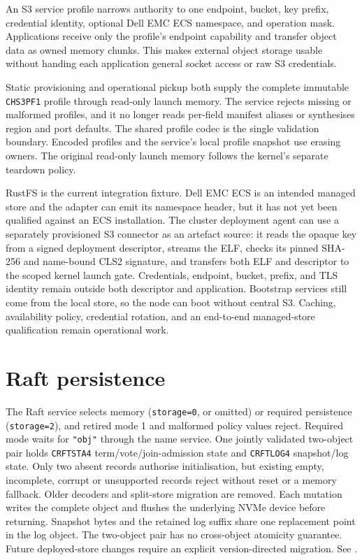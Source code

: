 An S3 service profile narrows authority to one endpoint, bucket, key prefix,
credential identity, optional Dell EMC ECS namespace, and operation mask.
Applications receive only the profile's endpoint capability and transfer
object data as owned memory chunks. This makes external object storage usable
without handing each application general socket access or raw S3 credentials.

Static provisioning and operational pickup both supply the complete immutable
\texttt{CHS3PF1} profile through read-only launch memory. The service rejects
missing or malformed profiles, and it no longer reads per-field manifest aliases
or synthesises region and port defaults. The shared profile codec is the single
validation boundary. Encoded profiles and the service's local profile snapshot
use erasing owners. The original read-only launch memory follows the kernel's
separate teardown policy.

RustFS is the current integration fixture. Dell EMC ECS is an intended managed
store and the adapter can emit its namespace header, but it has not yet been
qualified against an ECS installation. The cluster deployment agent can use a
separately provisioned S3 connector as an artefact source: it reads the opaque
key from a signed deployment descriptor, streams the ELF, checks its pinned
SHA-256 and name-bound CLS2 signature, and transfers both ELF and descriptor to
the scoped kernel launch gate. Credentials, endpoint, bucket, prefix, and TLS
identity remain outside both descriptor and application. Bootstrap services
still come from the local store, so the node can boot without central S3. Caching,
availability policy, credential rotation, and an end-to-end managed-store
qualification remain operational work.

\section{Raft persistence}

The Raft service selects memory (\texttt{storage=0}, or omitted) or required
persistence (\texttt{storage=2}), and retired mode 1 and malformed policy values
reject. Required mode waits for \texttt{"obj"} through the name service.
One jointly validated two-object pair holds \texttt{CRFTSTA4}
term/vote/join-admission state and \texttt{CRFTLOG4} snapshot/log state.
Only two absent records authorise initialisation, but existing empty, incomplete,
corrupt or unsupported records reject without reset or a memory fallback.
Older decoders and split-store migration are removed. Each mutation writes
the complete object and flushes the underlying NVMe device before returning.
Snapshot bytes and the retained log suffix share one replacement point in the
log object. The two-object pair has no cross-object atomicity guarantee.
Future deployed-store changes
require an explicit version-directed migration. See
.

